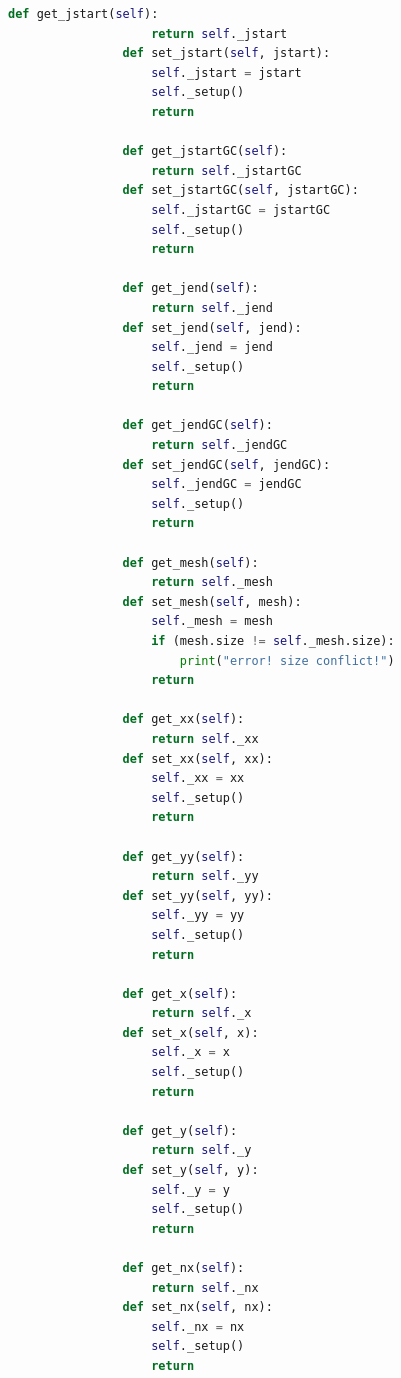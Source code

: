 \documentclass[12pt]{article}
\begin{document}
\begin{lstlisting}[language={Python}]
                def get_jstart(self):
                    return self._jstart
                def set_jstart(self, jstart):
                    self._jstart = jstart
                    self._setup()
                    return
            
                def get_jstartGC(self):
                    return self._jstartGC
                def set_jstartGC(self, jstartGC):
                    self._jstartGC = jstartGC
                    self._setup()
                    return
            
                def get_jend(self):
                    return self._jend
                def set_jend(self, jend):
                    self._jend = jend
                    self._setup()
                    return
                
                def get_jendGC(self):
                    return self._jendGC
                def set_jendGC(self, jendGC):
                    self._jendGC = jendGC
                    self._setup()
                    return
            
                def get_mesh(self):
                    return self._mesh
                def set_mesh(self, mesh):
                    self._mesh = mesh
                    if (mesh.size != self._mesh.size): 
                        print("error! size conflict!")
                    return
                
                def get_xx(self):
                    return self._xx
                def set_xx(self, xx):
                    self._xx = xx
                    self._setup()
                    return
            
                def get_yy(self):
                    return self._yy
                def set_yy(self, yy):
                    self._yy = yy
                    self._setup()
                    return
                
                def get_x(self):
                    return self._x
                def set_x(self, x):
                    self._x = x
                    self._setup()
                    return
            
                def get_y(self):
                    return self._y
                def set_y(self, y):
                    self._y = y
                    self._setup()
                    return
            
                def get_nx(self):
                    return self._nx
                def set_nx(self, nx):
                    self._nx = nx
                    self._setup()
                    return
                

\end{lstlisting}
\end{document}
